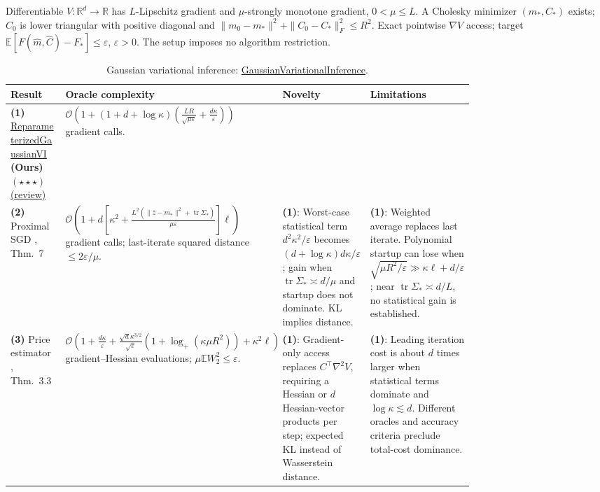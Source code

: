 \begin{table}[tp]
\centering
\caption{Gaussian variational inference: \href{https://github.com/k3nfalt/longtails/blob/main/LongTails/Setups/GaussianVariationalInference.lean}{GaussianVariationalInference}.}\label{tab:GaussianVariationalInference}
\parbox{\linewidth}{\footnotesize Differentiable $V:\mathbb R^d\to\mathbb R$ has $L$-Lipschitz gradient and $\mu$-strongly monotone gradient, $0<\mu\le L$. A Cholesky minimizer $(m_*,C_*)$ exists; $C_0$ is lower triangular with positive diagonal and $\|m_0-m_*\|^2+\|C_0-C_*\|_F^2\le R^2$. Exact pointwise $\nabla V$ access; target $\mathbb E[F(\widehat m,\widehat C)-F_*]\le\varepsilon$, $\varepsilon>0$. The setup imposes no algorithm restriction.}\par\smallskip
\begin{threeparttable}
\footnotesize
\setlength{\tabcolsep}{4pt}\renewcommand{\arraystretch}{1.25}
\begin{tabularx}{\linewidth}{@{}>{\raggedright\arraybackslash}p{0.20\linewidth}>{\raggedright\arraybackslash}p{0.32\linewidth}>{\raggedright\arraybackslash}p{0.25\linewidth}>{\raggedright\arraybackslash}X@{}}
\toprule
\textbf{Result} & \textbf{Oracle complexity} & \textbf{Novelty} & \textbf{Limitations} \\
\midrule
\textbf{(1)} \href{https://github.com/k3nfalt/longtails/blob/main/LongTails/Theorems/ReparameterizedGaussianVI.lean}{Reparameterized\allowbreak Gaussian\allowbreak VI} \textbf{(Ours)} $(\star\star\star)$ \href{https://github.com/k3nfalt/longtails/blob/main/scripts/reviews/ReparameterizedGaussianVI.md}{(review)} & $\mathcal{O}\!\left(1+(1+d+\log\kappa)\left(\frac{LR}{\sqrt{\mu\varepsilon}}+\frac{d\kappa}{\varepsilon}\right)\right)$ gradient calls. & & \\
\midrule[1.2pt]
\textbf{(2)} Proximal SGD \citep{gviKim2023v4}, Thm.~7 & $\mathcal{O}\!\left(1+d\left[\kappa^2+\frac{L^2(\|\bar z-m_*\|^2+\operatorname{tr}\Sigma_*)}{\mu\varepsilon}\right]\ell\right)$ gradient calls; last-iterate squared distance $\le2\varepsilon/\mu$. & \textbf{(1)}: Worst-case statistical term $d^2\kappa^2/\varepsilon$ becomes $(d+\log\kappa)d\kappa/\varepsilon$; gain when $\operatorname{tr}\Sigma_*\asymp d/\mu$ and startup does not dominate. KL implies distance. & \textbf{(1)}: Weighted average replaces last iterate. Polynomial startup can lose when $\sqrt{\mu R^2/\varepsilon}\gg\kappa\ell+d/\varepsilon$; near $\operatorname{tr}\Sigma_*\asymp d/L$, no statistical gain is established. \\
\midrule
\textbf{(3)} Price estimator \citep{gviKim2026v2}, Thm.~3.3 & $\mathcal{O}\!\left(1+\frac{d\kappa}{\varepsilon}+\frac{\sqrt d\kappa^{3/2}}{\sqrt\varepsilon}(1+\log_+(\kappa\mu R^2))+\kappa^2\ell\right)$ gradient--Hessian evaluations; $\mu\mathbb E W_2^2\le\varepsilon$. & \textbf{(1)}: Gradient-only access replaces $C^\top\nabla^2V$, requiring a Hessian or $d$ Hessian-vector products per step; expected KL instead of Wasserstein distance. & \textbf{(1)}: Leading iteration cost is about $d$ times larger when statistical terms dominate and $\log\kappa\lesssim d$. Different oracles and accuracy criteria preclude total-cost dominance. \\

\end{tabularx}
\end{threeparttable}
\end{table}
